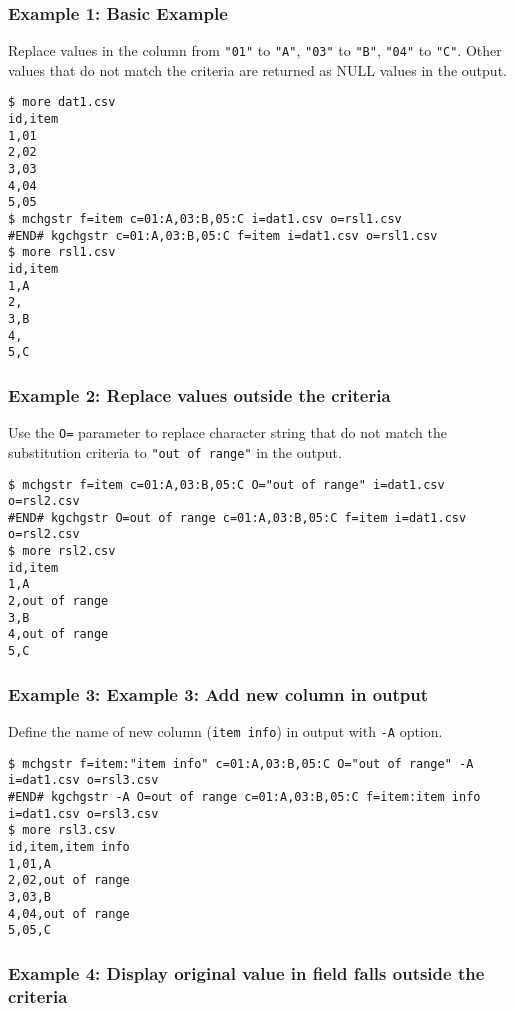 \subsubsection*{Example 1: Basic Example}

Replace values in the column from \verb|"01"| to \verb|"A"|, \verb|"03"| to \verb|"B"|, \verb|"04"| to \verb|"C"|. Other values that do not match the criteria are returned as NULL values in the output.


\begin{Verbatim}[baselinestretch=0.7,frame=single]
$ more dat1.csv
id,item
1,01
2,02
3,03
4,04
5,05
$ mchgstr f=item c=01:A,03:B,05:C i=dat1.csv o=rsl1.csv
#END# kgchgstr c=01:A,03:B,05:C f=item i=dat1.csv o=rsl1.csv
$ more rsl1.csv
id,item
1,A
2,
3,B
4,
5,C
\end{Verbatim}
\subsubsection*{Example 2: Replace values outside the criteria}

Use the \verb|O=| parameter to replace character string that do not match the substitution criteria to \verb|"out of range"| in the output.


\begin{Verbatim}[baselinestretch=0.7,frame=single]
$ mchgstr f=item c=01:A,03:B,05:C O="out of range" i=dat1.csv o=rsl2.csv
#END# kgchgstr O=out of range c=01:A,03:B,05:C f=item i=dat1.csv o=rsl2.csv
$ more rsl2.csv
id,item
1,A
2,out of range
3,B
4,out of range
5,C
\end{Verbatim}
\subsubsection*{Example 3: Example 3: Add new column in output}

Define the name of new column (\verb|item info|) in output with \verb|-A| option.


\begin{Verbatim}[baselinestretch=0.7,frame=single]
$ mchgstr f=item:"item info" c=01:A,03:B,05:C O="out of range" -A i=dat1.csv o=rsl3.csv
#END# kgchgstr -A O=out of range c=01:A,03:B,05:C f=item:item info i=dat1.csv o=rsl3.csv
$ more rsl3.csv
id,item,item info
1,01,A
2,02,out of range
3,03,B
4,04,out of range
5,05,C
\end{Verbatim}
\subsubsection*{Example 4: Display original value in field falls outside the criteria}

